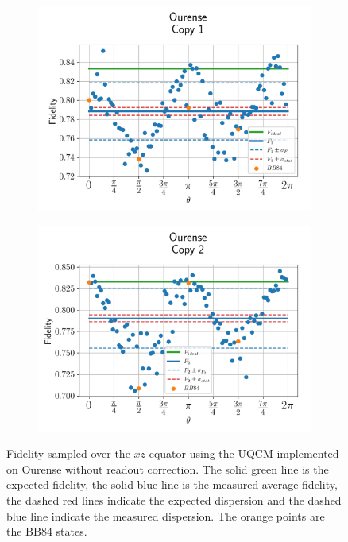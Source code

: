 \begin{figure}[H]
    \centering
    \begin{subfigure}{.45\textwidth}
      \centering
      \includegraphics[width=\textwidth]{Figures/UQCM/IBM/OnlyEquator/results_ourense_copy1.png}
    \end{subfigure}%
    \begin{subfigure}{.45\textwidth}
      \centering
      \includegraphics[width=\textwidth]{Figures/UQCM/IBM/OnlyEquator/results_ourense_copy2.png}
    \end{subfigure}
    \caption{Fidelity sampled over the $xz$-equator using the UQCM implemented on Ourense without readout correction. The solid green line is the expected fidelity, the solid blue line is the measured average fidelity, the dashed red lines indicate the expected dispersion and the dashed blue line indicate the measured dispersion. The orange points are the BB84 states.}
    
\end{figure}

